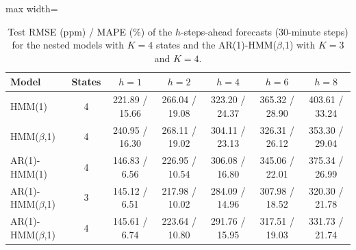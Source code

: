 \begin{table}[ht]
\centering
\begin{adjustbox}{max width=\textwidth}
\begin{tabular}{lcccccc}
\hline
Model & States & $h=1$ & $h=2$ & $h=4$ & $h=6$ & $h=8$ \\
\hline
HMM(1) & 4 & 221.89 / 15.66 & 266.04 / 19.08 & 323.20 / 24.37 & 365.32 / 28.90 & 403.61 / 33.24 \\
HMM($\beta$,1) & 4 & 240.95 / 16.30 & 268.11 / 19.02 & 304.11 / 23.13 & 326.31 / 26.12 & 353.30 / 29.04 \\
AR(1)-HMM(1) & 4 & 146.83 / 6.56 & 226.95 / 10.54 & 306.08 / 16.80 & 345.06 / 22.01 & 375.34 / 26.99 \\
AR(1)-HMM($\beta$,1) & 3 & 145.12 / 6.51 & 217.98 / 10.02 & 284.09 / 14.96 & 307.98 / 18.52 & 320.30 / 21.78 \\
AR(1)-HMM($\beta$,1) & 4 & 145.61 / 6.74 & 223.64 / 10.80 & 291.76 / 15.95 & 317.51 / 19.03 & 331.73 / 21.74 \\
\hline
\end{tabular}
\end{adjustbox}
\caption{Test RMSE (ppm) / MAPE (\%) of the $h$-steps-ahead forecasts (30-minute steps) for the nested models with $K=4$ states and the AR(1)-HMM($\beta$,1) with $K=3$ and $K=4$.}
\label{tab:test_metrics_room_015_calibrated_anchor}
\end{table}
